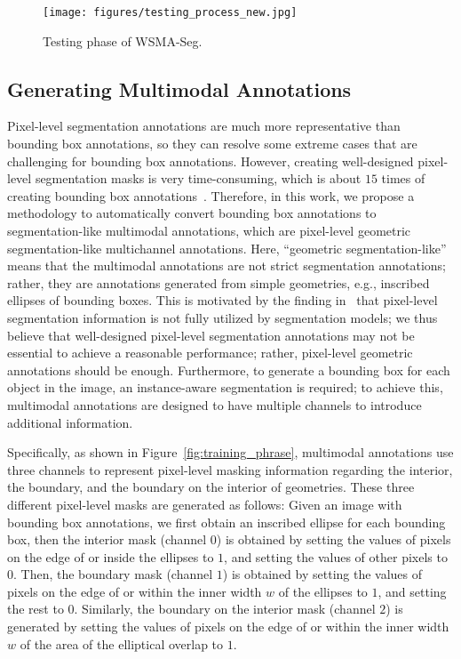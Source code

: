 \documentclass{article}
\begin{document}
\begin{figure}[!t]
\vspace{-0.5em}
  \centering
     \texttt{[image: figures/testing\_process\_new.jpg]}
     \caption{Testing phase of WSMA-Seg.\label{fig:testing_phrase}}
		\vspace{-1.5em}
\end{figure}


\subsection{Generating Multimodal Annotations}

Pixel-level segmentation annotations are much more representative than bounding box annotations, so they can resolve some extreme cases that are challenging for bounding box annotations. However, creating well-designed pixel-level segmentation masks is very time-consuming, which is about $15$ times of creating bounding box annotations~\cite{lin2014microsoft}. Therefore, in this work, we propose a methodology to automatically convert  bounding box annotations to segmentation-like multimodal annotations, which are pixel-level geometric segmentation-like multichannel annotations. Here, ``geometric segmentation-like'' means that the multimodal annotations are not strict segmentation annotations; rather, they are annotations generated from simple geometries, e.g., inscribed ellipses of bounding boxes. This is motivated by the finding in~\cite{dai2015boxsup} that  pixel-level segmentation information is not fully utilized by segmentation models; we thus believe that  well-designed pixel-level segmentation annotations may not be essential to achieve a reasonable performance; rather,  pixel-level geometric annotations should be enough. Furthermore, to generate a bounding box for each object in the image, an instance-aware segmentation is required; to achieve this, multimodal annotations are designed to have multiple channels to introduce additional information.

Specifically, as shown in Figure~\ref{fig:training_phrase}, multimodal annotations use three channels to represent pixel-level masking information regarding the interior, the boundary, and the boundary on the interior of geometries. These three different pixel-level masks are generated as follows: Given an image with bounding box annotations, we first obtain an inscribed ellipse for each bounding box, then the interior mask (channel $0$) is obtained by setting the values of pixels on the edge of or inside the ellipses to $1$, and setting the values of other pixels to $0$. Then, the boundary mask (channel $1$) is obtained by setting the values of pixels on the edge of or within the inner width $w$ of the ellipses to $1$, and setting the rest to $0$. Similarly, the boundary on the interior mask (channel $2$) is generated by setting the values of pixels on the edge of or within the inner width $w$ of the area of the elliptical overlap to $1$.
\end{document}
